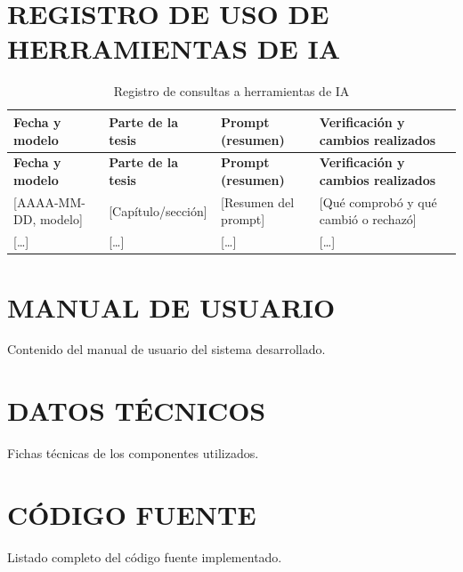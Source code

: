 \documentclass[12pt, letterpaper, oneside]{book}
\begin{document}
\begin{appendices}
\chapter{REGISTRO DE USO DE HERRAMIENTAS DE IA}
\label{apx:registro-ia}
\begin{longtable}{>{\raggedright}p{2.6cm}>{\raggedright}p{3cm}>{\raggedright}p{3.4cm}>{\raggedright\arraybackslash}p{5.2cm}}
    \caption{Registro de consultas a herramientas de IA}\label{tab:registro-ia}\\
    \toprule
    \textbf{Fecha y modelo} & \textbf{Parte de la tesis} & \textbf{Prompt (resumen)} & \textbf{Verificación y cambios realizados} \\
    \midrule
    \endfirsthead
    \toprule
    \textbf{Fecha y modelo} & \textbf{Parte de la tesis} & \textbf{Prompt (resumen)} & \textbf{Verificación y cambios realizados} \\
    \midrule
    \endhead
    \bottomrule
    \endfoot
    {[AAAA-MM-DD, modelo]} & {[Capítulo/sección]} & {[Resumen del prompt]} & {[Qué comprobó y qué cambió o rechazó]} \\
    {[\dots]} & {[\dots]} & {[\dots]} & {[\dots]} \\
\end{longtable}

\chapter{MANUAL DE USUARIO}
Contenido del manual de usuario del sistema desarrollado.

\chapter{DATOS TÉCNICOS}
Fichas técnicas de los componentes utilizados.

\chapter{CÓDIGO FUENTE}
Listado completo del código fuente implementado.

\end{appendices}
\end{document}
